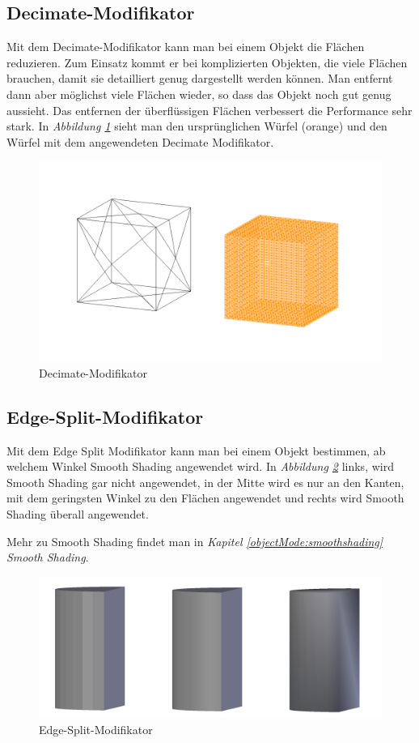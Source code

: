\subsection{Decimate-Modifikator}
\label{Decimate:heading}
Mit dem Decimate-Modifikator kann man bei einem Objekt die Flächen reduzieren.\citep{blender:decimate_modifier} Zum Einsatz kommt er bei komplizierten
Objekten, die viele Flächen brauchen, damit sie detailliert genug dargestellt werden können. Man entfernt dann aber möglichst viele Flächen
wieder, so dass das Objekt noch gut genug aussieht. Das entfernen der überflüssigen Flächen verbessert die Performance sehr stark.
In \textit{Abbildung \ref{modifikatoren:image6}} sieht man den ursprünglichen Würfel (orange) und den Würfel mit dem angewendeten
Decimate Modifikator.
\begin{figure}[h]
    \centering
    \includegraphics[width=.8\textwidth]{images/Modifikatoren-Decimate.png}
    \caption{Decimate-Modifikator}
    \label{modifikatoren:image6}
\end{figure}

\subsection{Edge-Split-Modifikator}
\label{Edge_Split:heading}
Mit dem Edge Split Modifikator kann man bei einem Objekt bestimmen, ab welchem Winkel Smooth Shading angewendet wird.\citep{blender:edgesplit_modifier}
In \textit{Abbildung \ref{modifikatoren:image7}} links, wird Smooth Shading gar nicht angewendet, in der Mitte wird es nur an
den Kanten, mit dem geringsten Winkel zu den Flächen angewendet und rechts wird Smooth Shading überall angewendet.

Mehr zu Smooth Shading findet man in \textit{Kapitel \ref{objectMode:smoothshading} \dq Smooth Shading\dq}.
\begin{figure}[h]
    \centering
    \includegraphics[width=.8\textwidth]{images/Modifikatoren-Edgesplit.png}
    \caption{Edge-Split-Modifikator}
    \label{modifikatoren:image7}
\end{figure}